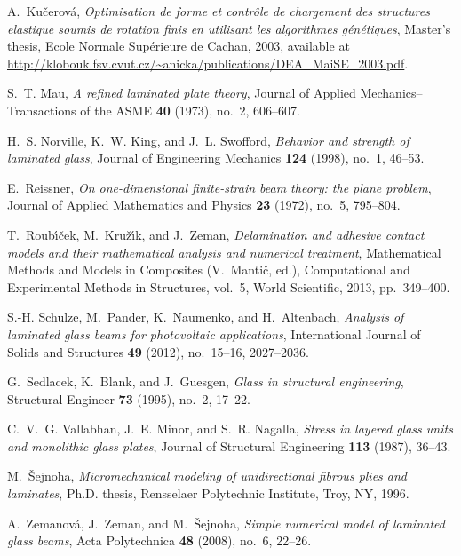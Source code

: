 \documentclass[11pt]{article}
\begin{document}
\begin{thebibliography}{10}
A.~Ku\v{c}erov\'a, \emph{Optimisation de forme et contr\^ole de chargement des
  structures elastique soumis de rotation finis en utilisant les algorithmes
  g\'en\'etiques}, Master's thesis, Ecole Normale Sup\'erieure de Cachan, 2003,
  available at
  \url{http://klobouk.fsv.cvut.cz/~anicka/publications/DEA_MaiSE_2003.pdf}.

S.~T. Mau, \emph{A refined laminated plate theory}, Journal of Applied
  Mechanics--Transactions of the ASME \textbf{40} (1973), no.~2, 606--607.

H.~S. Norville, K.~W. King, and J.~L. Swofford, \emph{Behavior and strength of
  laminated glass}, Journal of Engineering Mechanics \textbf{124} (1998),
  no.~1, 46--53.

E.~Reissner, \emph{On one-dimensional finite-strain beam theory: the plane
  problem}, Journal of Applied Mathematics and Physics \textbf{23} (1972),
  no.~5, 795--804.

T.~Roub\'\i\v{c}ek, M.~Kru\v{z}\'{\i}k, and J.~Zeman, \emph{Delamination and
  adhesive contact models and their mathematical analysis and numerical
  treatment}, Mathematical Methods and Models in Composites (V.~Manti\v{c},
  ed.), Computational and Experimental Methods in Structures, vol.~5, World
  Scientific, 2013, pp.~349--400.

S.-H. Schulze, M.~Pander, K.~Naumenko, and H.~Altenbach, \emph{Analysis of
  laminated glass beams for photovoltaic applications}, International Journal
  of Solids and Structures \textbf{49} (2012), no.~15--16, 2027--2036.

G.~Sedlacek, K.~Blank, and J.~Guesgen, \emph{Glass in structural engineering},
  Structural Engineer \textbf{73} (1995), no.~2, 17--22.

C.~V.~G. Vallabhan, J.~E. Minor, and S.~R. Nagalla, \emph{Stress in layered
  glass units and monolithic glass plates}, Journal of Structural Engineering
  \textbf{113} (1987), 36--43.

M.~\v{S}ejnoha, \emph{Micromechanical modeling of unidirectional fibrous plies
  and laminates}, Ph.D. thesis, Rensselaer Polytechnic Institute, Troy, NY,
  1996.

A.~Zemanov\'{a}, J.~Zeman, and M.~\v{S}ejnoha, \emph{Simple numerical model of
  laminated glass beams}, Acta Polytechnica \textbf{48} (2008), no.~6, 22--26.

\end{thebibliography}
\end{document}
